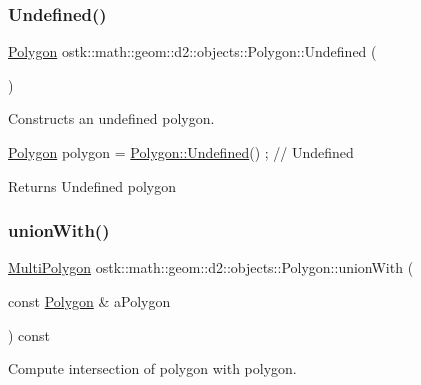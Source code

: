 \subsubsection{\texorpdfstring{Undefined()}{Undefined()}}
{\footnotesize\ttfamily \hyperlink{classostk_1_1math_1_1geom_1_1d2_1_1objects_1_1_polygon}{Polygon} ostk\+::math\+::geom\+::d2\+::objects\+::\+Polygon\+::\+Undefined (\begin{DoxyParamCaption}{ }\end{DoxyParamCaption})\hspace{0.3cm}{\ttfamily [static]}}



Constructs an undefined polygon. 


\begin{DoxyCode}
\hyperlink{classostk_1_1math_1_1geom_1_1d2_1_1objects_1_1_polygon_adaf9ef564754ab10ed3dd0d5fa0d90ea}{Polygon} polygon = \hyperlink{classostk_1_1math_1_1geom_1_1d2_1_1objects_1_1_polygon_af260e109c9315fd31f7f24f3154dcbf2}{Polygon::Undefined}() ; \textcolor{comment}{// Undefined}
\end{DoxyCode}


\begin{DoxyReturn}{Returns}
Undefined polygon 
\end{DoxyReturn}
\mbox{\label{classostk_1_1math_1_1geom_1_1d2_1_1objects_1_1_polygon_ad01feda42e80b74752d3529bc122981b}} 
\subsubsection{\texorpdfstring{union\+With()}{unionWith()}}
{\footnotesize\ttfamily \hyperlink{classostk_1_1math_1_1geom_1_1d2_1_1objects_1_1_multi_polygon}{Multi\+Polygon} ostk\+::math\+::geom\+::d2\+::objects\+::\+Polygon\+::union\+With (\begin{DoxyParamCaption}\item[{const \hyperlink{classostk_1_1math_1_1geom_1_1d2_1_1objects_1_1_polygon}{Polygon} \&}]{a\+Polygon }\end{DoxyParamCaption}) const}



Compute intersection of polygon with polygon. 


